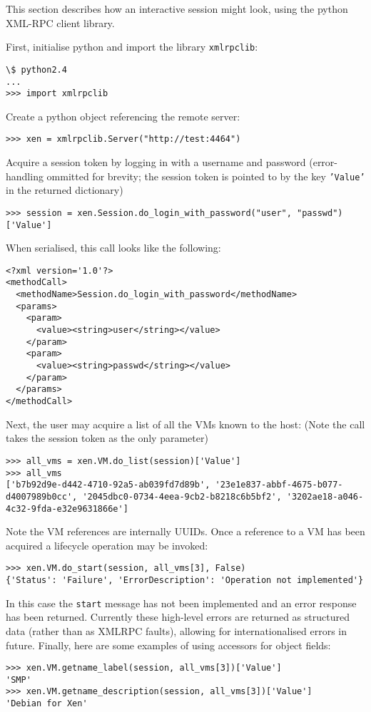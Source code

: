 This section describes how an interactive session might look, using the python
XML-RPC client library. 

First, initialise python and import the library {\tt xmlrpclib}:

\begin{verbatim}
\$ python2.4
...
>>> import xmlrpclib
\end{verbatim}

Create a python object referencing the remote server:

\begin{verbatim}
>>> xen = xmlrpclib.Server("http://test:4464")
\end{verbatim}

Acquire a session token by logging in with a username and password (error-handling ommitted for brevity; the session token is pointed to by the key {\tt 'Value'} in the returned dictionary)

\begin{verbatim}
>>> session = xen.Session.do_login_with_password("user", "passwd")['Value']
\end{verbatim}

When serialised, this call looks like the following:

\begin{verbatim}
<?xml version='1.0'?>
<methodCall>
  <methodName>Session.do_login_with_password</methodName>
  <params>
    <param>
      <value><string>user</string></value>
    </param>
    <param>
      <value><string>passwd</string></value>
    </param>
  </params>
</methodCall>
\end{verbatim}

Next, the user may acquire a list of all the VMs known to the host: (Note the call takes the session token as the only parameter)

\begin{verbatim}
>>> all_vms = xen.VM.do_list(session)['Value']
>>> all_vms
['b7b92d9e-d442-4710-92a5-ab039fd7d89b', '23e1e837-abbf-4675-b077-d4007989b0cc', '2045dbc0-0734-4eea-9cb2-b8218c6b5bf2', '3202ae18-a046-4c32-9fda-e32e9631866e']
\end{verbatim}

Note the VM references are internally UUIDs. Once a reference to a VM has been acquired a lifecycle operation may be invoked:

\begin{verbatim}
>>> xen.VM.do_start(session, all_vms[3], False)
{'Status': 'Failure', 'ErrorDescription': 'Operation not implemented'}
\end{verbatim}

In this case the {\tt start} message has not been implemented and an error response has been returned. Currently these high-level errors are returned as structured data (rather than as XMLRPC faults), allowing for internationalised errors in future. Finally, here are some examples of using accessors for object fields:

\begin{verbatim}
>>> xen.VM.getname_label(session, all_vms[3])['Value']
'SMP'
>>> xen.VM.getname_description(session, all_vms[3])['Value']
'Debian for Xen'
\end{verbatim}
